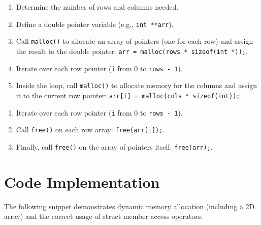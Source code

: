 \begin{example}
\begin{enumerate}
    \item Determine the number of rows and columns needed.
    \item Define a double pointer variable (e.g., \texttt{int **arr}).
    \item Call \texttt{malloc()} to allocate an array of pointers (one for each row) and assign the result to the double pointer: \texttt{arr = malloc(rows * sizeof(int *));}.
    \item Iterate over each row pointer (\texttt{i} from 0 to \texttt{rows - 1}).
    \item Inside the loop, call \texttt{malloc()} to allocate memory for the columns and assign it to the current row pointer: \texttt{arr[i] = malloc(cols * sizeof(int));}.
\end{enumerate}
\end{example}

\begin{example}
\begin{enumerate}
    \item Iterate over each row pointer (\texttt{i} from 0 to \texttt{rows - 1}).
    \item Call \texttt{free()} on each row array: \texttt{free(arr[i]);}.
    \item Finally, call \texttt{free()} on the array of pointers itself: \texttt{free(arr);}.
\end{enumerate}
\end{example}

\newpage
\section{Code Implementation}
The following snippet demonstrates dynamic memory allocation (including a 2D array) and the correct usage of struct member access operators.

